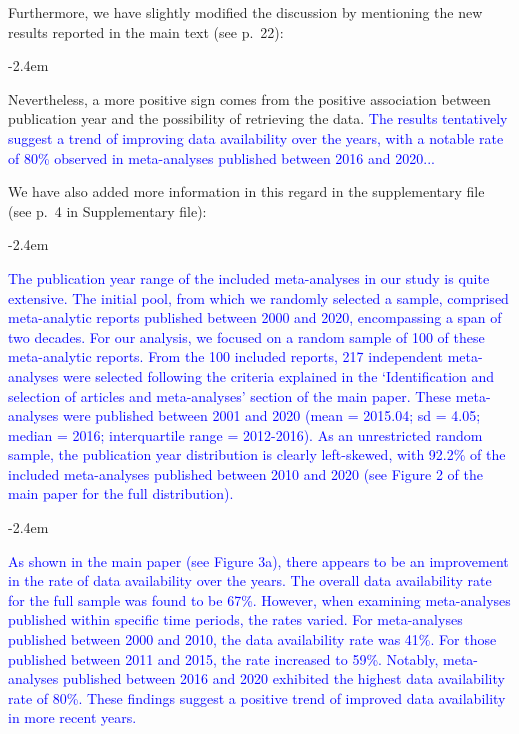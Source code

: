 \documentclass[draft]{article}
\renewenvironment{quote}{\begin{fquote}\advance\leftmargini -2.4em\begin{oldquote}}{\end{oldquote}\end{fquote}}
\newenvironment{fquote}
  {\def\FrameCommand{
	\fboxsep=0.6em %
	\fcolorbox{black}{white}}%
    \MakeFramed {\advance\hsize-2\width \FrameRestore}
    \begin{minipage}{\linewidth}
  }
  {\end{minipage}\endMakeFramed}
\begin{document}
Furthermore, we have slightly modified the discussion by mentioning the new results reported in the main text (see p.~22):

\begin{quote}
Nevertheless, a more positive sign comes from the positive association between publication year and the possibility of retrieving the data. \textcolor{blue}{The results tentatively suggest a trend of improving data availability over the years, with a notable rate of 80\% observed in meta-analyses published between 2016 and 2020...}
\end{quote}


We have also added more information in this regard in the supplementary file (see p.~4 in Supplementary file):

\begin{quote}
\textcolor{blue}{The publication year range of the included meta-analyses in our study is quite extensive. The initial pool, from which we randomly selected a sample, comprised meta-analytic reports published between 2000 and 2020, encompassing a span of two decades. For our analysis, we focused on a random sample of 100 of these meta-analytic reports.  From the 100 included reports, 217 independent meta-analyses were selected following the criteria explained in the ‘Identification and selection of articles and meta-analyses’ section of the main paper. These meta-analyses were published between 2001 and 2020 (mean = 2015.04; sd = 4.05; median =
2016; interquartile range = 2012-2016). As an unrestricted random sample, the publication year distribution is clearly left-skewed, with 92.2\% of the included meta-analyses published between 2010 and 2020 (see Figure 2 of the main paper for the full distribution).}
\end{quote}

\begin{quote}
\textcolor{blue}{As shown in the main paper (see Figure 3a), there appears to be an improvement in the rate of data availability over the years. The overall data availability rate for the full sample was found to be 67\%. However, when examining meta-analyses published within specific time periods, the rates varied. For meta-analyses published between 2000 and 2010, the data availability rate was 41\%. For those published between 2011 and 2015, the rate increased to 59\%. Notably, meta-analyses published between 2016 and 2020 exhibited the highest data availability rate of 80\%. These findings suggest a positive trend of improved data availability in more recent years.}
\end{quote}
\end{document}
